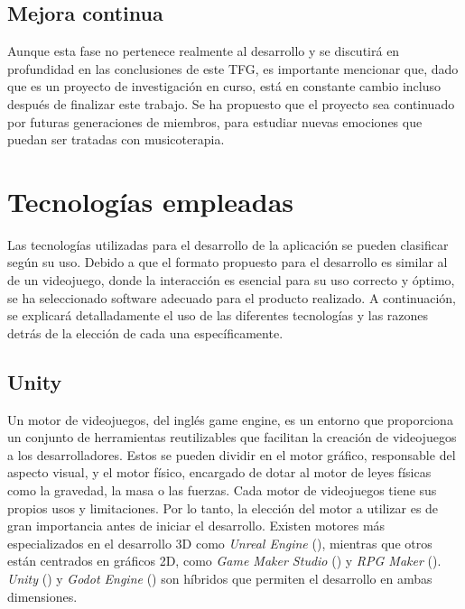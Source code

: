 \subsection{Mejora continua}

Aunque esta fase no pertenece realmente al desarrollo y se discutirá en profundidad en las conclusiones de este TFG, es importante mencionar que, dado que es un proyecto de investigación en curso, está en constante cambio incluso después de finalizar este trabajo. Se ha propuesto que el proyecto sea continuado por futuras generaciones de miembros, para estudiar nuevas emociones que puedan ser tratadas con musicoterapia.

\section{Tecnologías empleadas}

Las tecnologías utilizadas para el desarrollo de la aplicación se pueden clasificar según su uso. Debido a que el formato propuesto para el desarrollo es similar al de un videojuego, donde la interacción es esencial para su uso correcto y óptimo, se ha seleccionado software adecuado para el producto realizado. A continuación, se explicará detalladamente el uso de las diferentes tecnologías y las razones detrás de la elección de cada una específicamente.

\subsection{Unity}

Un motor de videojuegos, del inglés game engine, es un entorno que proporciona un conjunto de herramientas reutilizables que facilitan la creación de videojuegos a los desarrolladores. Estos se pueden dividir en el motor gráfico, responsable del aspecto visual, y el motor físico, encargado de dotar al motor de leyes físicas como la gravedad, la masa o las fuerzas. Cada motor de videojuegos tiene sus propios usos y limitaciones. Por lo tanto, la elección del motor a utilizar es de gran importancia antes de iniciar el desarrollo. Existen motores más especializados en el desarrollo 3D como \textit{Unreal Engine} (\cite{UE:1998}), mientras que otros están centrados en gráficos 2D, como \textit{Game Maker Studio} (\cite{GMS:1999}) y \textit{RPG Maker} (\cite{RPGM:1992}). \textit{Unity} (\cite{UNITY:2005}) y \textit{Godot Engine} (\cite{GODOT:2001}) son híbridos que permiten el desarrollo en ambas dimensiones.

